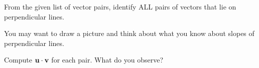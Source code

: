 \documentclass{ximera}
\begin{document}
\begin{problem}\label{prob:perpvectors1}
From the given list of vector pairs, identify ALL pairs of vectors that lie on perpendicular lines.
\begin{hint}
You may want to draw a picture and think about what you know about slopes of perpendicular lines.
\end{hint}
\begin{selectAll}
\end{selectAll}
Compute $\mathbf{u}\cdot\mathbf{v}$ for each pair.  What do you observe? 
\end{problem}
\end{document}
